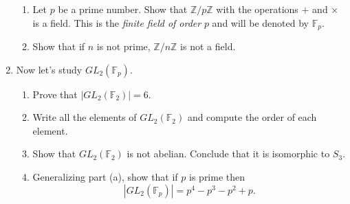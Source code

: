 \documentclass[11pt]{article}
\newcommand{\bF}{\mathbb{F}}
\newcommand{\bZ}{\mathbb{Z}}
\begin{document}
\begin{enumerate}
\begin{enumerate}
    \item Let $p$ be a prime number.  Show that $\bZ/p\bZ$ with the operations $+$ and $\times$ is a field.  This is the \textit{finite field of order} $p$ and will be denoted by $\bF_p$.
    \item Show that if $n$ is not prime, $\bZ/n\bZ$ is not a field.
  \end{enumerate}
\item Now let's study $GL_2(\bF_p)$.
  \begin{enumerate}
    \item Prove that $|GL_2(\bF_2)| = 6$.
    \item Write all the elements of $GL_2(\bF_2)$ and compute the order of each element.
    \item Show that $GL_2(\bF_2)$ is not abelian.  Conclude that it is isomorphic to $S_3$.
    \item Generalizing part (a), show that if $p$ is prime then
    \[|GL_2(\bF_p)| = p^4-p^3-p^2+p.\]
  \end{enumerate}
\end{enumerate}
\end{document}
